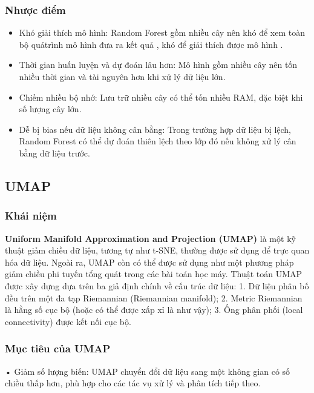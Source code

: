 \documentclass[
]{article}
\begin{document}
\subsubsection{Nhược điểm}\label{nhux1b0ux1ee3c-ux111iux1ec3m-3}

\begin{itemize}
\item
  Khó giải thích mô hình: Random Forest gồm nhiều cây nên khó để xem
  toàn bộ quátrình mô hình đưa ra kết quả , khó để giải thích được mô
  hình .
\item
  Thời gian huấn luyện và dự đoán lâu hơn: Mô hình gồm nhiều cây nên tốn
  nhiều thời gian và tài nguyên hơn khi xử lý dữ liệu lớn.
\item
  Chiếm nhiều bộ nhớ: Lưu trữ nhiều cây có thể tốn nhiều RAM, đặc biệt
  khi số lượng cây lớn.
\item
  Dễ bị bias nếu dữ liệu không cân bằng: Trong trường hợp dữ liệu bị
  lệch, Random Forest có thể dự đoán thiên lệch theo lớp đó nếu không xử
  lý cân bằng dữ liệu trước.
\end{itemize}

\subsection{UMAP}\label{umap}

\subsubsection{Khái niệm}\label{khuxe1i-niux1ec7m-5}

\textbf{Uniform Manifold Approximation and Projection (UMAP)} là một kỹ
thuật giảm chiều dữ liệu, tương tự như t-SNE, thường được sử dụng để
trực quan hóa dữ liệu. Ngoài ra, UMAP còn có thể được sử dụng như một
phương pháp giảm chiều phi tuyến tổng quát trong các bài toán học máy.
Thuật toán UMAP được xây dựng dựa trên ba giả định chính về cấu trúc dữ
liệu: 1. Dữ liệu phân bố đều trên một đa tạp Riemannian (Riemannian
manifold); 2. Metric Riemannian là hằng số cục bộ (hoặc có thể được xấp
xỉ là như vậy); 3. Ống phân phối (local connectivity) được kết nối cục
bộ.

\subsubsection{Mục tiêu của UMAP}\label{mux1ee5c-tiuxeau-cux1ee7a-umap}

• Giảm số lượng biến: UMAP chuyển đổi dữ liệu sang một không gian có số
chiều thấp hơn, phù hợp cho các tác vụ xử lý và phân tích tiếp theo.
\end{document}
